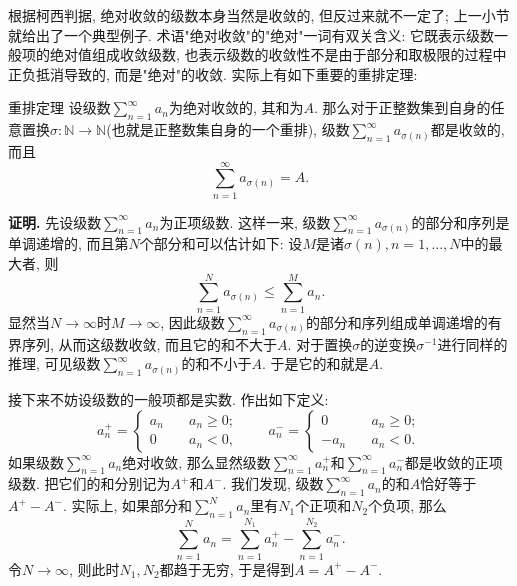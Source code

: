 根据柯西判据, 绝对收敛的级数本身当然是收敛的, 但反过来就不一定了; 上一小节就给出了一个典型例子. 术语"绝对收敛"的"绝对"一词有双关含义: 它既表示级数一般项的绝对值组成收敛级数, 也表示级数的收敛性不是由于部分和取极限的过程中正负抵消导致的, 而是"绝对"的收敛. 实际上有如下重要的重排定理:

\begin{theorem}{重排定理}
设级数$\sum_{n=1}^\infty a_n$为绝对收敛的, 其和为$A$. 那么对于正整数集到自身的任意置换$\sigma:\mathbb{N}\to\mathbb{N}$(也就是正整数集自身的一个重排), 级数$\sum_{n=1}^\infty a_{\sigma(n)}$都是收敛的, 而且
$$
\sum_{n=1}^\infty a_{\sigma(n)}=A.
$$
\end{theorem}

\textbf{证明.} 先设级数$\sum_{n=1}^\infty a_n$为正项级数. 这样一来, 级数$\sum_{n=1}^\infty a_{\sigma(n)}$的部分和序列是单调递增的, 而且第$N$个部分和可以估计如下: 设$M$是诸$\sigma(n),n=1,...,N$中的最大者, 则
$$
\sum_{n=1}^Na_{\sigma(n)}\leq\sum_{n=1}^{M}a_n.
$$
显然当$N\to\infty$时$M\to\infty$, 因此级数$\sum_{n=1}^\infty a_{\sigma(n)}$的部分和序列组成单调递增的有界序列, 从而这级数收敛, 而且它的和不大于$A$. 对于置换$\sigma$的逆变换$\sigma^{-1}$进行同样的推理, 可见级数$\sum_{n=1}^\infty a_{\sigma(n)}$的和不小于$A$. 于是它的和就是$A$.

接下来不妨设级数的一般项都是实数. 作出如下定义:
$$
a_n^+=\left\{\begin{array}{cc}
{a_n}\quad &a_n\geq0;\\
0\quad &a_n<0,
\end{array}\right.
\quad\quad
a_n^-=\left\{\begin{array}{cc}
0\quad &a_n\geq0;\\
-a_n\quad &a_n<0.
\end{array}\right.
$$
如果级数$\sum_{n=1}^\infty a_n$绝对收敛, 那么显然级数$\sum_{n=1}^\infty a_n^+$和$\sum_{n=1}^\infty a_n^-$都是收敛的正项级数. 把它们的和分别记为$A^+$和$A^-$. 我们发现, 级数$\sum_{n=1}^\infty a_n$的和$A$恰好等于$A^+-A^-$. 实际上, 如果部分和$\sum_{n=1}^N a_n$里有$N_1$个正项和$N_2$个负项, 那么
$$
\sum_{n=1}^N a_n=\sum_{n=1}^{N_1} a_n^+-\sum_{n=1}^{N_2} a_n^-.
$$
令$N\to\infty$, 则此时$N_1,N_2$都趋于无穷, 于是得到$A=A^+-A^-$.